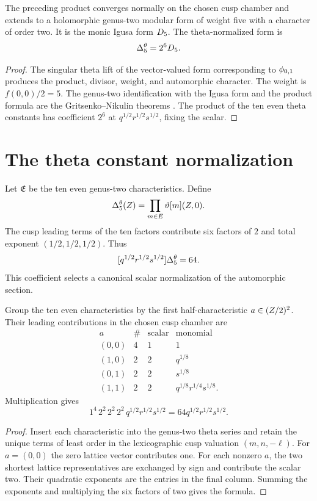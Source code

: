 \begin{theorem}
The preceding product converges normally on the chosen cusp chamber and extends to a holomorphic genus-two modular form of weight five with a character of order two. It is the monic Igusa form ${D_5}$. The theta-normalized form is
\[
 {\Delta^{\theta}_5}=2^6{D_5}.
\]
\end{theorem}
\begin{proof}
The singular theta lift of the vector-valued form corresponding to ${\phi_{0,1}}$ produces the product, divisor, weight, and automorphic character. The weight is $f(0,0)/2=5$. The genus-two identification with the Igusa form and the product formula are the Gritsenko--Nikulin theorems \cite{Borcherds95,Borcherds98,GN97,GN98b}. The product of the ten even theta constants has coefficient $2^6$ at $q^{1/2}r^{1/2}s^{1/2}$, fixing the scalar.
\end{proof}

\section{The theta constant normalization}
Let $\mathfrak E$ be the ten even genus-two characteristics. Define
\[
 {\Delta^{\theta}_5}(Z)=\prod_{m\in E}\vartheta[m](Z,0).
\]
The cusp leading terms of the ten factors contribute six factors of $2$ and total exponent $(1/2,1/2,1/2)$. Thus
\[
 [q^{1/2}r^{1/2}s^{1/2}]{\Delta^{\theta}_5}=64.
\]
This coefficient selects a canonical scalar normalization of the automorphic section.

\begin{proposition}
Group the ten even characteristics by the first half-characteristic $a\in(Z/2)^2$. Their leading contributions in the chosen cusp chamber are
\[
\begin{array}{c|c|c|c}
a&\#&\text{scalar}&\text{monomial}\\ \hline
(0,0)&4&1&1\\
(1,0)&2&2&q^{1/8}\\
(0,1)&2&2&s^{1/8}\\
(1,1)&2&2&q^{1/8}r^{1/4}s^{1/8}.
\end{array}
\]
Multiplication gives
\[
 1^4\,2^2\,2^2\,2^2\,
 q^{1/2}r^{1/2}s^{1/2}
 =64q^{1/2}r^{1/2}s^{1/2}.
\]
\end{proposition}
\begin{proof}
Insert each characteristic into the genus-two theta series and retain the unique terms of least order in the lexicographic cusp valuation $(m,n,-\ell)$. For $a=(0,0)$ the zero lattice vector contributes one. For each nonzero $a$, the two shortest lattice representatives are exchanged by sign and contribute the scalar two. Their quadratic exponents are the entries in the final column. Summing the exponents and multiplying the six factors of two gives the formula.
\end{proof}

